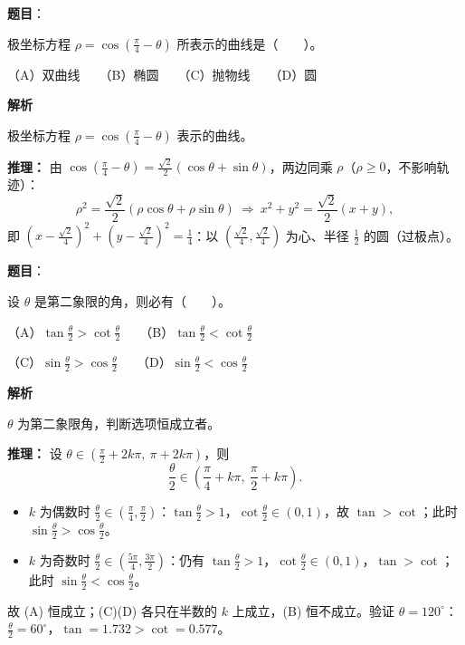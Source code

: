 \begin{answer}

\textbf{题目}：

极坐标方程 $\rho=\cos\left(\frac{\pi}{4}-\theta\right)$ 所表示的曲线是\mbox{（　　）}。

（A）双曲线　　（B）椭圆　　（C）抛物线　　（D）圆

\textbf{解析}

极坐标方程 $\rho=\cos\left(\frac\pi4-\theta\right)$ 表示的曲线。

\textbf{推理：} 由 $\cos\left(\frac\pi4-\theta\right)=\frac{\sqrt2}{2}(\cos\theta+\sin\theta)$，两边同乘 $\rho$（$\rho\ge0$，不影响轨迹）：
\nopagebreak[4]
\[\rho^2=\frac{\sqrt2}{2}(\rho\cos\theta+\rho\sin\theta)\ \Longrightarrow\ x^2+y^2=\frac{\sqrt2}{2}(x+y),\]
即 $\left(x-\frac{\sqrt2}{4}\right)^2+\left(y-\frac{\sqrt2}{4}\right)^2=\frac14$：以 $\left(\frac{\sqrt2}{4},\frac{\sqrt2}{4}\right)$ 为心、半径 $\frac12$ 的圆（过极点）。


\end{answer}
\begin{answer}

\textbf{题目}：

设 $\theta$ 是第二象限的角，则必有\mbox{（　　）}。

（A）$\tan\frac\theta2>\cot\frac\theta2$　　（B）$\tan\frac\theta2<\cot\frac\theta2$

（C）$\sin\frac\theta2>\cos\frac\theta2$　　（D）$\sin\frac\theta2<\cos\frac\theta2$

\textbf{解析}

$\theta$ 为第二象限角，判断选项恒成立者。

\textbf{推理：} 设 $\theta\in\left(\frac\pi2+2k\pi,\ \pi+2k\pi\right)$，则
\nopagebreak[4]
\[\frac\theta2\in\left(\frac\pi4+k\pi,\ \frac\pi2+k\pi\right).\]
\begin{itemize}
\item $k$ 为偶数时 $\frac\theta2\in\left(\frac\pi4,\frac\pi2\right)$：$\tan\frac\theta2>1$，$\cot\frac\theta2\in(0,1)$，故 $\tan>\cot$；此时 $\sin\frac\theta2>\cos\frac\theta2$。
\item $k$ 为奇数时 $\frac\theta2\in\left(\frac{5\pi}4,\frac{3\pi}2\right)$：仍有 $\tan\frac\theta2>1$，$\cot\frac\theta2\in(0,1)$，$\tan>\cot$；此时 $\sin\frac\theta2<\cos\frac\theta2$。
\end{itemize}

故 (A) 恒成立；(C)(D) 各只在半数的 $k$ 上成立，(B) 恒不成立。验证 $\theta=120^\circ$：$\frac\theta2=60^\circ$，$\tan=1.732>\cot=0.577$。


\end{answer}
